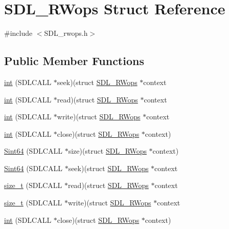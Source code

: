 \hypertarget{structSDL__RWops}{\section{S\+D\+L\+\_\+\+R\+Wops Struct Reference}
\label{structSDL__RWops}
}


{\ttfamily \#include $<$S\+D\+L\+\_\+rwops.\+h$>$}

\subsection*{Public Member Functions}
\begin{DoxyCompactItemize}
\item 
\hyperlink{structSDL__RWops_a25b6f8f86737e5f6af594d4069885771}{int} (S\+D\+L\+C\+A\+L\+L $\ast$seek)(struct \hyperlink{structSDL__RWops}{S\+D\+L\+\_\+\+R\+Wops} $\ast$context
\item 
\hyperlink{structSDL__RWops_a22a0344f0e73d5917aa0dc91417e44a1}{int} (S\+D\+L\+C\+A\+L\+L $\ast$read)(struct \hyperlink{structSDL__RWops}{S\+D\+L\+\_\+\+R\+Wops} $\ast$context
\item 
\hyperlink{structSDL__RWops_a281fa6bf3562d8289f9ef75f658b5a44}{int} (S\+D\+L\+C\+A\+L\+L $\ast$write)(struct \hyperlink{structSDL__RWops}{S\+D\+L\+\_\+\+R\+Wops} $\ast$context
\item 
\hyperlink{structSDL__RWops_ab303bcbb0f6742a141ba8b2998923f47}{int} (S\+D\+L\+C\+A\+L\+L $\ast$close)(struct \hyperlink{structSDL__RWops}{S\+D\+L\+\_\+\+R\+Wops} $\ast$context)
\item 
\hyperlink{structSDL__RWops_a45f66dbb683a88281d96f83ca18c525f}{Sint64} (S\+D\+L\+C\+A\+L\+L $\ast$size)(struct \hyperlink{structSDL__RWops}{S\+D\+L\+\_\+\+R\+Wops} $\ast$context)
\item 
\hyperlink{structSDL__RWops_a767114391a3d1b4a7c214da3e164acf5}{Sint64} (S\+D\+L\+C\+A\+L\+L $\ast$seek)(struct \hyperlink{structSDL__RWops}{S\+D\+L\+\_\+\+R\+Wops} $\ast$context
\item 
\hyperlink{structSDL__RWops_acd9a3c6e840d285c1e30cadaf99097b2}{size\+\_\+t} (S\+D\+L\+C\+A\+L\+L $\ast$read)(struct \hyperlink{structSDL__RWops}{S\+D\+L\+\_\+\+R\+Wops} $\ast$context
\item 
\hyperlink{structSDL__RWops_a5f12fd517afffba5bfaff4643d6792b1}{size\+\_\+t} (S\+D\+L\+C\+A\+L\+L $\ast$write)(struct \hyperlink{structSDL__RWops}{S\+D\+L\+\_\+\+R\+Wops} $\ast$context
\item 
\hyperlink{structSDL__RWops_ab303bcbb0f6742a141ba8b2998923f47}{int} (S\+D\+L\+C\+A\+L\+L $\ast$close)(struct \hyperlink{structSDL__RWops}{S\+D\+L\+\_\+\+R\+Wops} $\ast$context)

\end{DoxyCompactItemize}
